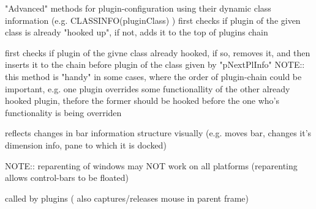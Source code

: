 \label{wxframelayoutaddplugin}


"Advanced" methods for plugin-configuration	using their dynamic class information (e.g. CLASSINFO(pluginClass) ) first checks if plugin of the given class is already "hooked up",
if not, adds it to the top of plugins chain


\label{wxframelayoutaddpluginbefore}


first checks if plugin of the givne class already hooked,
if so, removes it, and then inserts it to the chain
before plugin of the class given by "pNextPlInfo"
NOTE:: this method is "handy" in some cases, where the order
of plugin-chain could be important, e.g. one plugin overrides
some functionallity of the other already hooked plugin,
thefore the former should be hooked before the one
who's functionality is being overriden


\label{wxframelayoutapplybarproperties}


reflects changes in bar information structure visually
(e.g. moves bar, changes it's dimension info, pane to which it is docked)


\label{wxframelayoutcanreparent}


NOTE:: reparenting of windows may NOT work on all platforms
(reparenting allows control-bars to be floated)


\label{wxframelayoutcaptureeventsforpane}


called by plugins ( also captures/releases mouse in parent frame)


\label{wxframelayoutcaptureeventsforplugin}



